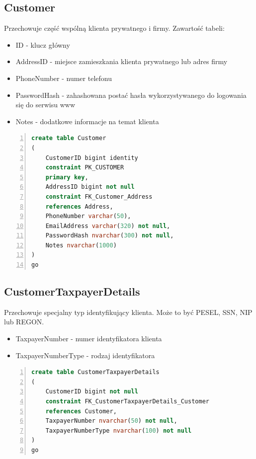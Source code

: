 \documentclass[]{article}
\begin{document}
	\subsection{Customer}
	Przechowuje część wspólną klienta prywatnego i firmy. Zawartość tabeli:
	\begin{itemize}
		\item ID - klucz główny
		\item AddressID - miejsce zamieszkania klienta prywatnego lub adres firmy
		\item PhoneNumber - numer telefonu
		\item PasswordHash - zahashowana postać hasła wykorzystywanego do logowania się do serwisu www
		\item Notes - dodatkowe informacje na temat klienta
	\end{itemize}
	\begin{lstlisting}[language=SQL,
						showspaces=false,
						basicstyle=\ttfamily,
						numbers=left,
						numberstyle=\tiny,
						backgroundcolor=\color{lightg},
						keywordstyle=\color{lightblue},
						commentstyle=\color{gray}]
create table Customer
(
	CustomerID bigint identity
	constraint PK_CUSTOMER
	primary key,
	AddressID bigint not null
	constraint FK_Customer_Address
	references Address,
	PhoneNumber varchar(50),
	EmailAddress varchar(320) not null,
	PasswordHash nvarchar(300) not null,
	Notes nvarchar(1000)
)
go
	\end{lstlisting}
	\subsection{CustomerTaxpayerDetails}
	Przechowuje specjalny typ identyfikujący klienta. Może to być PESEL, SSN, NIP lub REGON.
	\begin{itemize}
		\item TaxpayerNumber - numer identyfikatora klienta
		\item TaxpayerNumberType - rodzaj identyfikatora 
	\end{itemize}
	\begin{lstlisting}[language=SQL,
						showspaces=false,
						basicstyle=\ttfamily,
						numbers=left,
						numberstyle=\tiny,
						backgroundcolor=\color{lightg},
						keywordstyle=\color{lightblue},
						commentstyle=\color{gray}]
create table CustomerTaxpayerDetails
(
	CustomerID bigint not null
	constraint FK_CustomerTaxpayerDetails_Customer
	references Customer,
	TaxpayerNumber nvarchar(50) not null,
	TaxpayerNumberType nvarchar(100) not null
)
go
	\end{lstlisting}
\end{document}
